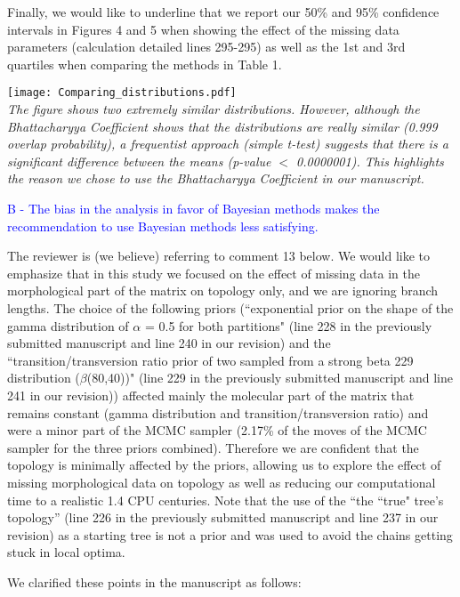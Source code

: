\documentclass[11pt]{letter}
\begin{document}
\begin{letter}{}
Finally, we would like to underline that we report our 50\% and 95\% confidence intervals in Figures 4 and 5 when showing the effect of the missing data parameters (calculation detailed lines 295-295) as well as the 1st and 3rd quartiles when comparing the methods in Table 1.

\texttt{[image: Comparing\_distributions.pdf]} \\
\textit{The figure shows two extremely similar distributions. However, although the Bhattacharyya Coefficient shows that the distributions are really similar (0.999 overlap probability), a frequentist approach (simple t-test) suggests that there is a significant difference between the means (p-value $<$ 0.0000001). This highlights the reason we chose to use the Bhattacharyya Coefficient in our manuscript.}


\textcolor{blue}{B - The bias in the analysis in favor of Bayesian methods makes the recommendation to use Bayesian methods less satisfying.}

The reviewer is (we believe) referring to comment 13 below. We would like to emphasize that in this study we focused on the effect of missing data in the morphological part of the matrix on topology only, and we are ignoring branch lengths. The choice of the following priors (``exponential prior on the shape of the gamma distribution of $\alpha$ = 0.5 for both partitions" (line 228 in the previously submitted manuscript and line 240 in our revision) and the ``transition/transversion ratio prior of two sampled from a strong beta 229 distribution ($\beta$(80,40))" (line 229 in the previously submitted manuscript and line 241 in our revision)) affected mainly the molecular part of the matrix that remains constant (gamma distribution and transition/transversion ratio) and were a minor part of the MCMC sampler (2.17\% of the moves of the MCMC sampler for the three priors combined). Therefore we are confident that the topology is minimally affected by the priors, allowing us to explore the effect of missing morphological data on topology as well as reducing our computational time to a realistic 1.4 CPU centuries. Note that the use of the ``the ``true" tree's topology'' (line 226 in the previously submitted manuscript and line 237 in our revision) as a starting tree is not a prior and was used to avoid the chains getting stuck in local optima.

We clarified these points in the manuscript as follows:


\end{letter}
\end{document}
